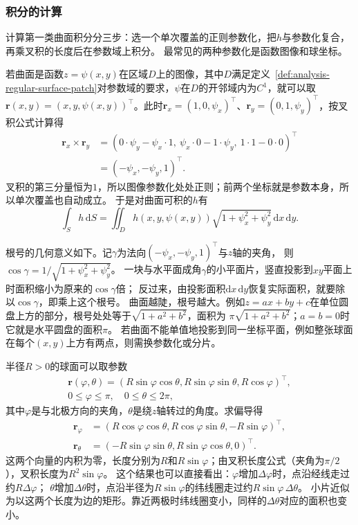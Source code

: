 \subsubsection{积分的计算}

计算第一类曲面积分分三步：选一个单次覆盖的正则参数化，把$h$与参数化复合，再乘叉积的长度后在参数域上积分。
最常见的两种参数化是函数图像和球坐标。

若曲面是函数$z=\psi(x,y)$在区域$D$上的图像，其中$D$满足定义~\ref{def:analysis-regular-surface-patch}对参数域的要求，$\psi$在$D$的开邻域内为$C^1$，就可以取
$\bm r(x,y)=(x,y,\psi(x,y))^\top$。此时$\bm r_x=(1,0,\psi_x)^\top$、$\bm r_y=(0,1,\psi_y)^\top$，按叉积公式计算得
\[
 \begin{aligned}
 \bm r_x\times\bm r_y
 &=(0\cdot\psi_y-\psi_x\cdot1,\ \psi_x\cdot0-1\cdot\psi_y,\ 1\cdot1-0\cdot0)^\top\\
 &=(-\psi_x,-\psi_y,1)^\top.
 \end{aligned}
\]
叉积的第三分量恒为$1$，所以图像参数化处处正则；前两个坐标就是参数本身，所以单次覆盖也自动成立。
于是对曲面可积的$h$有
\[
 \int_Sh\,\mathrm dS
 =\iint_Dh(x,y,\psi(x,y))\sqrt{1+\psi_x^2+\psi_y^2}\,\mathrm dx\,\mathrm dy.
\]

根号的几何意义如下。记$\gamma$为法向$(-\psi_x,-\psi_y,1)^\top$与$z$轴的夹角，
则$\cos\gamma=1/\sqrt{1+\psi_x^2+\psi_y^2}$。
一块与水平面成角$\gamma$的小平面片，竖直投影到$xy$平面上时面积缩小为原来的$\cos\gamma$倍；
反过来，由投影面积$\mathrm dx\,\mathrm dy$恢复实际面积，就要除以$\cos\gamma$，即乘上这个根号。
曲面越陡，根号越大。例如$z=ax+by+c$在单位圆盘上方的部分，根号处处等于$\sqrt{1+a^2+b^2}$，面积为
$\pi\sqrt{1+a^2+b^2}$；$a=b=0$时它就是水平圆盘的面积$\pi$。
若曲面不能单值地投影到同一坐标平面，例如整张球面在每个$(x,y)$上方有两点，则需换参数化或分片。

半径$R>0$的球面可以取参数
\[
 \begin{gathered}
 \bm r(\varphi,\theta)
 =(R\sin\varphi\cos\theta,R\sin\varphi\sin\theta,R\cos\varphi)^\top,\\
 0\leq\varphi\leq\pi,\quad 0\leq\theta\leq2\pi,
 \end{gathered}
\]
其中$\varphi$是与北极方向的夹角，$\theta$是绕$z$轴转过的角度。求偏导得
\[
 \begin{aligned}
 \bm r_\varphi&=(R\cos\varphi\cos\theta,R\cos\varphi\sin\theta,-R\sin\varphi)^\top,\\
 \bm r_\theta&=(-R\sin\varphi\sin\theta,R\sin\varphi\cos\theta,0)^\top.
 \end{aligned}
\]
这两个向量的内积为零，长度分别为$R$和$R\sin\varphi$；由叉积长度公式（夹角为$\pi/2$），叉积长度为$R^2\sin\varphi$。
这个结果也可以直接看出：$\varphi$增加$\Delta\varphi$时，点沿经线走过约$R\Delta\varphi$；
$\theta$增加$\Delta\theta$时，点沿半径为$R\sin\varphi$的纬线圈走过约$R\sin\varphi\,\Delta\theta$。
小片近似为以这两个长度为边的矩形。靠近两极时纬线圈变小，同样的$\Delta\theta$对应的面积也变小。

